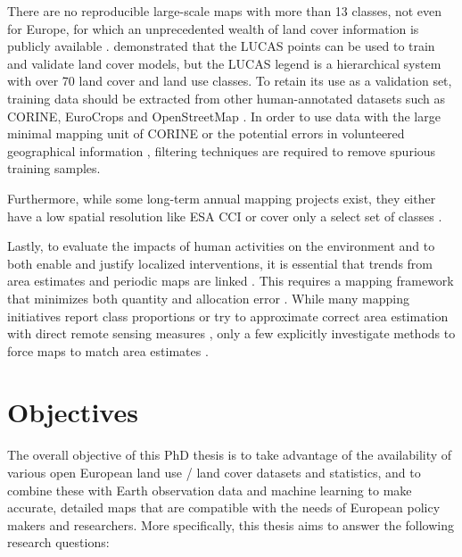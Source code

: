     There are no reproducible large-scale maps with more than 13 classes, not even for Europe, for which an unprecedented wealth of land cover information is publicly available \citep{dandrimont2020harmonised}. \citet{pflugmacher2019mapping} demonstrated that the LUCAS points can be used to train and validate land cover models, but the LUCAS legend is a hierarchical system with over 70 land cover and land use classes. To retain its use as a validation set, training data should be extracted from other human-annotated datasets such as CORINE, EuroCrops \citep{schneider2023eurocrops} and OpenStreetMap \citep{schultz2017open}.  In order to use data with the large minimal mapping unit of CORINE or the potential errors in volunteered geographical information \citep{neis2014recent}, filtering techniques are required to remove spurious training samples.

    Furthermore, while some long-term annual mapping projects exist, they either have a low spatial resolution like ESA CCI \citep{harper202229} or cover only a select set of classes \citep{potapov2022global}.

    Lastly, to evaluate the impacts of human activities on the environment and to both enable and justify localized interventions, it is essential that trends from area estimates and periodic maps are linked \citep{olofsson2014good,szantoi2020addressing,winkler2021global}. This requires a mapping framework that minimizes both quantity and allocation error \citep{pontius2011death}. While many mapping initiatives report class proportions \citep{pflugmacher2019mapping} or try to approximate correct area estimation with direct remote sensing measures \citep{kleinewillinghofer2022unbiased}, only a few explicitly investigate methods to force maps to match area estimates \citep{strahler1980use,horvath2021comparison}.
    

\section{Objectives}
\label{sec:research_objectives}
The overall objective of this PhD thesis is to take advantage of the availability of various open European land use / land cover datasets and statistics, and to combine these with Earth observation data and machine learning to make accurate, detailed maps that are compatible with the needs of European policy makers and researchers. More specifically, this thesis aims to answer the following research questions:

